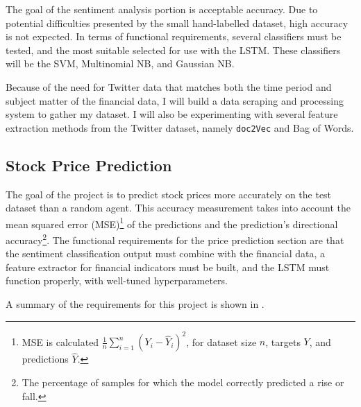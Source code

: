 \documentclass[12pt,a4paper,twoside,openright]{report}
\begin{document}
The goal of the sentiment analysis portion is acceptable accuracy. Due to
potential difficulties presented by the small hand-labelled dataset, high
accuracy is not expected.
In terms of functional requirements, several classifiers must be
tested, and the most suitable selected for use
with the LSTM. These classifiers will be the SVM,
Multinomial NB, and Gaussian NB. 

Because of the need for Twitter data that matches both the time period and
subject matter of the financial data, I will build a data scraping and processing
system to gather my dataset. I will also be experimenting
with several feature extraction methods from the Twitter dataset, namely
\texttt{doc2Vec}\cite{Le14} and Bag of Words.


\subsection*{Stock Price Prediction}

The goal of the project is to predict stock
prices more accurately on the test dataset than a random agent. This accuracy
measurement takes into account the mean squared error (MSE)\footnote{MSE
is calculated $\frac{1}{n} \sum_{i=1}^n (Y_i - \hat{Y}_i)^2$, for dataset size $n$,
targets $Y$, and predictions $\hat{Y}$.} of the predictions
and the prediction's directional accuracy\footnote{The percentage of samples for which the model correctly predicted a rise 
or fall.}. The functional requirements for the price prediction
section are that the sentiment classification output
must combine with the financial data, a feature extractor for financial
indicators must be built, and the LSTM must function properly, with
well-tuned hyperparameters.

A summary of the requirements for this project is shown in .
\end{document}
